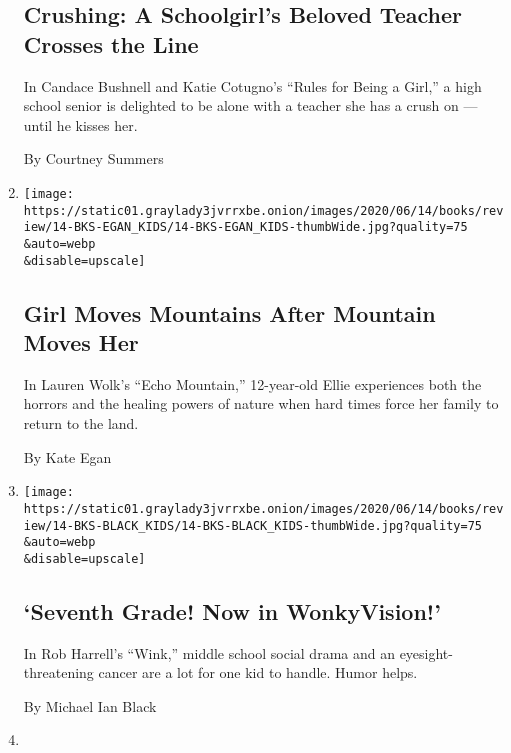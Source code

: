 \begin{enumerate}
{  \subsection{Crushing: A Schoolgirl's Beloved Teacher Crosses the
  Line}\label{crushing-a-schoolgirls-beloved-teacher-crosses-the-line}}

  In Candace Bushnell and Katie Cotugno's ``Rules for Being a Girl,'' a
  high school senior is delighted to be alone with a teacher she has a
  crush on --- until he kisses her.

  By Courtney Summers
\item
  \href{/2020/06/06/books/review/lauren-wolk-echo-mountain.html}{}

  \texttt{[image: https://static01.graylady3jvrrxbe.onion/images/2020/06/14/books/review/14-BKS-EGAN\_KIDS/14-BKS-EGAN\_KIDS-thumbWide.jpg?quality=75\\\&auto=webp\\\&disable=upscale]}

  \hypertarget{girl-moves-mountains-after-mountain-moves-her}{%
  \subsection{Girl Moves Mountains After Mountain Moves
  Her}\label{girl-moves-mountains-after-mountain-moves-her}}

  In Lauren Wolk's ``Echo Mountain,'' 12-year-old Ellie experiences both
  the horrors and the healing powers of nature when hard times force her
  family to return to the land.

  By Kate Egan
\item
  \href{/2020/06/06/books/review/wink-rob-harrell.html}{}

  \texttt{[image: https://static01.graylady3jvrrxbe.onion/images/2020/06/14/books/review/14-BKS-BLACK\_KIDS/14-BKS-BLACK\_KIDS-thumbWide.jpg?quality=75\\\&auto=webp\\\&disable=upscale]}

  \hypertarget{seventh-grade-now-in-wonkyvision}{%
  \subsection{`Seventh Grade! Now in
  WonkyVision!'}\label{seventh-grade-now-in-wonkyvision}}

  In Rob Harrell's ``Wink,'' middle school social drama and an
  eyesight-threatening cancer are a lot for one kid to handle. Humor
  helps.

  By Michael Ian Black
\item
  \href{/2020/05/30/books/review/thieves-of-weirdwood-christian-mckay-heidicker.html}{}


\end{enumerate}
